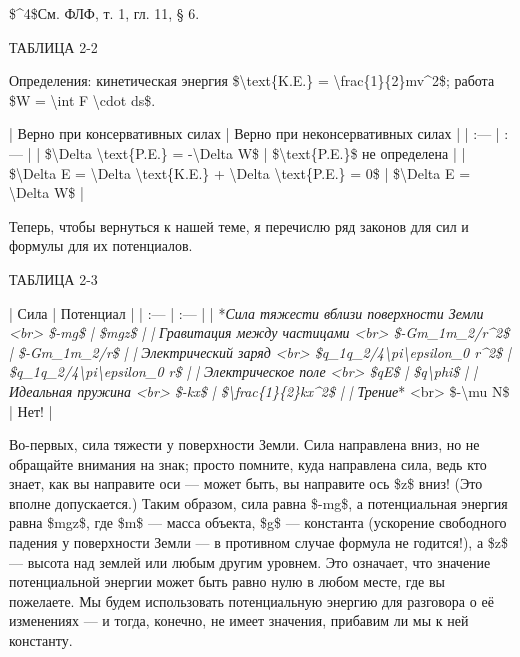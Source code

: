 \documentclass[10pt,oneside]{article}
\newcommand{\TipsRunning}[1]{\par\vspace{2bp}{\centering\footnotesize #1\par}\vspace{2bp}}
\newcommand{\TipsSubsection}[1]{\par\vspace{6bp}{\normalsize\bfseries #1\par}\vspace{2bp}}
\begin{document}
\$\textasciicircum{}4\$См. ФЛФ, т. 1, гл. 11, § 6.\par

\TipsRunning{З А К О Н Ы  И  И Н Т У И Ц И Я \textbackslash{}textbullet\{\} 6 7}

ТАБЛИЦА 2-2\par

Определения: кинетическая энергия \$\textbackslash{}text\{K.E.\} = \textbackslash{}frac\{1\}\{2\}mv\textasciicircum{}2\$; работа \$W = \textbackslash{}int F \textbackslash{}cdot ds\$.\par

| Верно при консервативных силах | Верно при неконсервативных силах | | :--- | :--- | | \$\textbackslash{}Delta \textbackslash{}text\{P.E.\} = -\textbackslash{}Delta W\$ | \$\textbackslash{}text\{P.E.\}\$ не определена | | \$\textbackslash{}Delta E = \textbackslash{}Delta \textbackslash{}text\{K.E.\} + \textbackslash{}Delta \textbackslash{}text\{P.E.\} = 0\$ | \$\textbackslash{}Delta E = \textbackslash{}Delta W\$ |\par

\TipsSubsection{2-4 Силы и их потенциалы}

Теперь, чтобы вернуться к нашей теме, я перечислю ряд законов для сил и формулы для их потенциалов.\par

ТАБЛИЦА 2-3\par

| Сила | Потенциал | | :--- | :--- | | *\emph{Сила тяжести вблизи поверхности Земли}\emph{ <br> \$-mg\$ | \$mgz\$ | | }\emph{Гравитация между частицами}\emph{ <br> \$-Gm\_1m\_2/r\textasciicircum{}2\$ | \$-Gm\_1m\_2/r\$ | | }\emph{Электрический заряд}\emph{ <br> \$q\_1q\_2/4\textbackslash{}pi\textbackslash{}epsilon\_0 r\textasciicircum{}2\$ | \$q\_1q\_2/4\textbackslash{}pi\textbackslash{}epsilon\_0 r\$ | | }\emph{Электрическое поле}\emph{ <br> \$qE\$ | \$q\textbackslash{}phi\$ | | }\emph{Идеальная пружина}\emph{ <br> \$-kx\$ | \$\textbackslash{}frac\{1\}\{2\}kx\textasciicircum{}2\$ | | }\emph{Трение}* <br> \$-\textbackslash{}mu N\$ | Нет! |\par

Во-первых, сила тяжести у поверхности Земли. Сила направлена вниз, но не обращайте внимания на знак; просто помните, куда направлена сила, ведь кто знает, как вы направите оси --- может быть, вы направите ось \$z\$ вниз! (Это вполне допускается.) Таким образом, сила равна \$-mg\$, а потенциальная энергия равна \$mgz\$, где \$m\$ --- масса объекта, \$g\$ --- константа (ускорение свободного падения у поверхности Земли --- в противном случае формула не годится!), а \$z\$ --- высота над землей или любым другим уровнем. Это означает, что значение потенциальной энергии может быть равно нулю в любом месте, где вы пожелаете. Мы будем использовать потенциальную энергию для разговора о её изменениях --- и тогда, конечно, не имеет значения, прибавим ли мы к ней константу.\par
\end{document}
